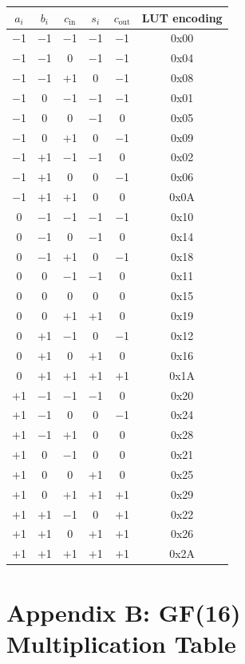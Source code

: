 \begin{longtable}[]{@{}cccccc@{}}
\toprule\noalign{}
\(a_i\) & \(b_i\) & \(c_{\text{in}}\) & \(s_i\) & \(c_{\text{out}}\) & LUT encoding \\
\midrule\noalign{}
\endhead
\bottomrule\noalign{}
\endlastfoot
$-$1 & $-$1 & $-$1 & $-$1 & $-$1 & 0x00 \\
$-$1 & $-$1 & 0 & $-$1 & $-$1 & 0x04 \\
$-$1 & $-$1 & $+$1 & 0 & $-$1 & 0x08 \\
$-$1 & 0 & $-$1 & $-$1 & $-$1 & 0x01 \\
$-$1 & 0 & 0 & $-$1 & 0 & 0x05 \\
$-$1 & 0 & $+$1 & 0 & $-$1 & 0x09 \\
$-$1 & $+$1 & $-$1 & $-$1 & 0 & 0x02 \\
$-$1 & $+$1 & 0 & 0 & $-$1 & 0x06 \\
$-$1 & $+$1 & $+$1 & 0 & 0 & 0x0A \\
0 & $-$1 & $-$1 & $-$1 & $-$1 & 0x10 \\
0 & $-$1 & 0 & $-$1 & 0 & 0x14 \\
0 & $-$1 & $+$1 & 0 & $-$1 & 0x18 \\
0 & 0 & $-$1 & $-$1 & 0 & 0x11 \\
0 & 0 & 0 & 0 & 0 & 0x15 \\
0 & 0 & $+$1 & $+$1 & 0 & 0x19 \\
0 & $+$1 & $-$1 & 0 & $-$1 & 0x12 \\
0 & $+$1 & 0 & $+$1 & 0 & 0x16 \\
0 & $+$1 & $+$1 & $+$1 & $+$1 & 0x1A \\
$+$1 & $-$1 & $-$1 & $-$1 & 0 & 0x20 \\
$+$1 & $-$1 & 0 & 0 & $-$1 & 0x24 \\
$+$1 & $-$1 & $+$1 & 0 & 0 & 0x28 \\
$+$1 & 0 & $-$1 & 0 & 0 & 0x21 \\
$+$1 & 0 & 0 & $+$1 & 0 & 0x25 \\
$+$1 & 0 & $+$1 & $+$1 & $+$1 & 0x29 \\
$+$1 & $+$1 & $-$1 & 0 & $+$1 & 0x22 \\
$+$1 & $+$1 & 0 & $+$1 & $+$1 & 0x26 \\
$+$1 & $+$1 & $+$1 & $+$1 & $+$1 & 0x2A \\
\end{longtable}

\section{Appendix B: GF(16) Multiplication Table}\label{fa_71:appx-gf16}

